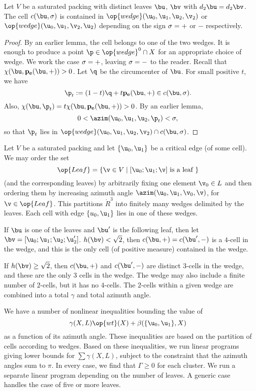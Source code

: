 \begin{lemma}  Let $V$ be a saturated packing with distinct leaves $\bu$, $\bv$ with $d_2\bu=d_2\bv$.
The cell $c(\bu,\sig)$ is contained in $\op{wedge}(\u_0,\u_1,\u_2,\v_2)$ or $\op{wedge}(\u_0,\u_1,\v_2,\u_2)$
depending on the sign $\sigma = +$ or $-$ respectively.
\end{lemma}

\begin{proof} By an earlier lemma,  the cell belongs to one of the two wedges.  It is enough
to produce a point $\p \in \op{wedge}^0\cap X$ for an appropriate choice of wedge.
We work the case $\sigma=+$, leaving $\sigma=-$ to the reader.
Recall that $\chi(\bu,\pe(\bu,+)) > 0$.  Let $\q$ be the circumcenter of $\bu$.  For small positive $t$,
we have 
\[
\p_t := (1-t)\q  + t \pe(\bu,+) \in c(\bu,\sig).
\]
Also, $\chi(\bu,\p_t) = t \chi(\bu,\pe(\bu,+)) > 0$.  By an earlier lemma,
\[
0 < \azim(\u_0,\u_1,\u_2,\p_t) < \sig,
\]
so that $\p_t$ lies in $\op{wedge}(\u_0,\u_1,\u_2,\v_2)\cap c(\bu,\sig)$.
\end{proof}

Let $V$ be a saturated packing and let $\{\u_0,\u_1\}$ be a critical edge (of some cell).
We may order the set 
\[
\op{Leaf} = \{ \v\in V \mid [\u_0;\u_1;\v] \text{ is a leaf } \}
\]
(and the corresponding leaves)
by arbitrarily fixing one element $\v_0\in L$ and then ordering them by increasing
azimuth angle $\azim(\u_0,\u_1,\v_0,\v)$, for $\v\in \op{Leaf}$.  This partitions $\ring{R}^3$ into
finitely many wedges delimited by the leaves.  Each cell with edge $\{u_0,\u_1\}$ lies in one of these
wedges.    

If  $\bu$ is one of the leaves and $\bu'$ is the following leaf, then let $\bv = [\u_0;\u_1;\u_2;\u_2']$.
$h(\bv) < \sqrt2$, then $c(\bu,+)=c(\bu',-)$ is a $4$-cell in the wedge,
 and this is the only cell (of positive measure)
contained in the wedge.

If $h(\bv)\ge\sqrt2$, then $c(\bu,+)$ and $c(\bu',-)$ are distinct $3$-cells in the wedge,
and these are the only $3$ cells in the wedge.  The wedge may also include a finite number of 
$2$-cells, but it has no $4$-cells.  The $2$-cells within a given wedge are combined into a 
total $\gamma$ and total azimuth angle.

We have a number of nonlinear inequalities bounding the value of 
\[
\gamma(X,L) \op{wt}(X) + \beta(\{\u_0,\u_1\},X)
\]
 as a function
of its azimuth angle.  These inequalities are based on the partition of cells according to wedges.
Based on these inequalities,
we run linear programs giving lower bounds for $\sum \gamma(X,L)$, subject to the constraint
that the azimuth angles sum to $\pi$.  In every case, we find that $\Gamma\ge0$ for each cluster.
We run a separate linear program depending on the number of leaves.  A generic case handles
the case of five or more leaves.


